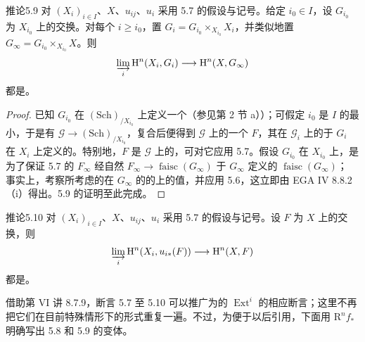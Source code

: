 \begin{SGAresult}{推论}{5.9}
对 $(X_i)_{i\in I}$、$X$、$u_{ij}$、$u_i$ 采用 5.7 的假设与记号。给定 $i_0\in I$，设 $G_{i_0}$ 为 $X_{i_0}$ 上的交换。对每个 $i\geq i_0$，置 $G_i=G_{i_0}\times_{X_{i_0}}X_i$，并类似地置 $G_\infty=G_{i_0}\times_{X_{i_0}}X$。则
\[
 \varinjlim_i\mathrm H^n(X_i,G_i)\longrightarrow\mathrm H^n(X,G_\infty)
\]
都是。
\end{SGAresult}
\begin{proof}
已知 $G_{i_0}$ 在 $(\mathrm{Sch})_{/X_{i_0}}$ 上定义一个（参见第 2 节 a））；可假定 $i_0$ 是 $I$ 的最小，于是有 $\mathscr G\to(\mathrm{Sch})_{/X_{i_0}}$，复合后便得到 $\mathscr G$ 上的一个 $F$，其在 $\mathscr G_i$ 上的于 $G_i$ 在 $X_i$ 上定义的。特别地，$F$ 是 $\mathscr G$ 上的，可对它应用 5.7。假设 $G_{i_0}$ 在 $X_{i_0}$ 上，是为了保证 5.7 的 $F_\infty$ 经自然 $F_\infty\to\operatorname{faisc}(G_\infty)$ 于 $G_\infty$ 定义的 $\operatorname{faisc}(G_\infty)$；
事实上，考察所考虑的在 $G_\infty$ 的的上的值，并应用 5.6，这立即由 EGA IV 8.8.2（i）得出。5.9 的证明至此完成。
\end{proof}

\begin{SGAresult}{推论}{5.10}
对 $(X_i)_{i\in I}$、$X$、$u_{ij}$、$u_i$ 采用 5.7 的假设与记号。设 $F$ 为 $X$ 上的交换，则
\[
 \varinjlim_i\mathrm H^n(X_i,u_{i*}(F))\longrightarrow\mathrm H^n(X,F)
\]
都是。
\end{SGAresult}
借助第 VI 讲 8.7.9，断言 5.7 至 5.10 可以推广为的 $\operatorname{Ext}^i$ 的相应断言；这里不再把它们在目前特殊情形下的形式重复一遍。不过，为便于以后引用，下面用 $\mathrm R^nf_*$ 明确写出 5.8 和 5.9 的变体。

